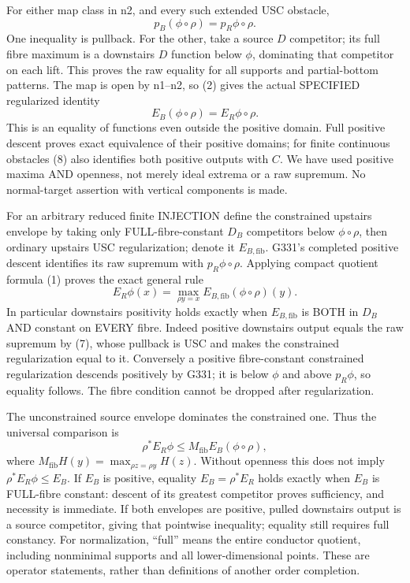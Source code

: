 \documentclass[11pt]{article}
\begin{document}
For either map class in n2, and every such extended USC obstacle,
\[
p_B(\phi\circ\rho)=p_R\phi\circ\rho.                \tag{9}
\]
One inequality is pullback. For the other, take a source $D$ competitor; its full fibre maximum is a downstairs $D$ function below $\phi$, dominating that competitor on each lift. This proves the raw equality for all supports and partial-bottom patterns. The map is open by n1--n2, so (2) gives the actual SPECIFIED regularized identity
\[
E_B(\phi\circ\rho)=E_R\phi\circ\rho.                \tag{10}
\]
This is an equality of functions even outside the positive domain. Full positive descent proves exact equivalence of their positive domains; for finite continuous obstacles (8) also identifies both positive outputs with $C$. We have used positive maxima AND openness, not merely ideal extrema or a raw supremum. No normal-target assertion with vertical components is made.

For an arbitrary reduced finite INJECTION define the constrained upstairs envelope by taking only FULL-fibre-constant $D_B$ competitors below $\phi\circ\rho$, then ordinary upstairs USC regularization; denote it $E_{B,\mathrm{fib}}$. G331's completed positive descent identifies its raw supremum with $p_R\phi\circ\rho$. Applying compact quotient formula (1) proves the exact general rule
\[
E_R\phi(x)=\max_{\rho y=x}E_{B,\mathrm{fib}}(\phi\circ\rho)(y). \tag{11}
\]
In particular downstairs positivity holds exactly when $E_{B,\mathrm{fib}}$ is BOTH in $D_B$ AND constant on EVERY fibre. Indeed positive downstairs output equals the raw supremum by (7), whose pullback is USC and makes the constrained regularization equal to it. Conversely a positive fibre-constant constrained regularization descends positively by G331; it is below $\phi$ and above $p_R\phi$, so equality follows. The fibre condition cannot be dropped after regularization.

The unconstrained source envelope dominates the constrained one. Thus the universal comparison is
\[
\rho^*E_R\phi\le M_{\mathrm{fib}} E_B(\phi\circ\rho),  \tag{12}
\]
where $M_{\mathrm{fib}}H(y)=\max_{\rho z=\rho y}H(z)$. Without openness this does not imply $\rho^*E_R\phi\le E_B$. If $E_B$ is positive, equality $E_B=\rho^*E_R$ holds exactly when $E_B$ is FULL-fibre constant: descent of its greatest competitor proves sufficiency, and necessity is immediate. If both envelopes are positive, pulled downstairs output is a source competitor, giving that pointwise inequality; equality still requires full constancy. For normalization, ``full'' means the entire conductor quotient, including nonminimal supports and all lower-dimensional points. These are operator statements, rather than definitions of another order completion.
\end{document}
